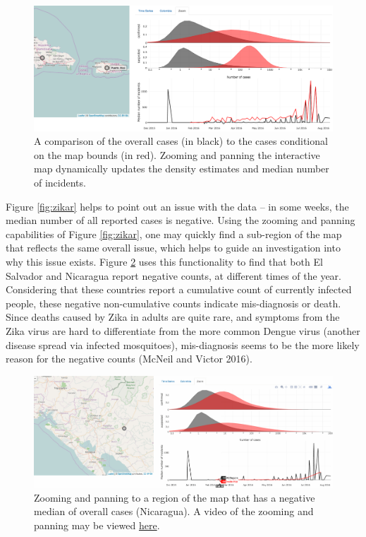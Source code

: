 \documentclass[12pt,]{article}
\theoremstyle{definition}
\theoremstyle{definition}
\theoremstyle{remark}
\begin{document}
\begin{figure}
\centering
\includegraphics{images/zikar-zoom}
\caption{\label{fig:zikar-zoom}A comparison of the overall cases (in black)
to the cases conditional on the map bounds (in red). Zooming and panning
the interactive map dynamically updates the density estimates and median
number of incidents.}
\end{figure}

Figure \ref{fig:zikar} helps to point out an issue with the data -- in
some weeks, the median number of all reported cases is negative. Using
the zooming and panning capabilities of Figure \ref{fig:zikar}, one may
quickly find a sub-region of the map that reflects the same overall
issue, which helps to guide an investigation into why this issue exists.
Figure \ref{fig:zikar-nicaragua} uses this functionality to find that
both El Salvador and Nicaragua report negative counts, at different
times of the year. Considering that these countries report a cumulative
count of currently infected people, these negative non-cumulative counts
indicate mis-diagnosis or death. Since deaths caused by Zika in adults
are quite rare, and symptoms from the Zika virus are hard to
differentiate from the more common Dengue virus (another disease spread
via infected mosquitoes), mis-diagnosis seems to be the more likely
reason for the negative counts (McNeil and Victor 2016).

\begin{figure}
\centering
\includegraphics{images/zikar-nicaragua.pdf}
\caption{\label{fig:zikar-nicaragua}Zooming and panning to a region of the
map that has a negative median of overall cases (Nicaragua). A video of
the zooming and panning may be viewed
\href{https://vimeo.com/190610577}{here}.}
\end{figure}
\end{document}
